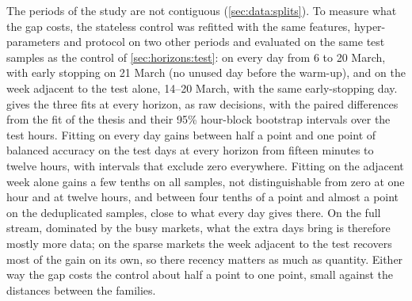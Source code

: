 The periods of the study are not contiguous (\cref{sec:data:splits}).  To measure what the
gap costs, the stateless control was refitted with the same features, hyper-parameters and
protocol on two other periods and evaluated on the same test samples as the control of
\cref{sec:horizons:test}: on every day from 6 to 20 March, with early stopping on 21 March
(no unused day before the warm-up), and on the week adjacent to the test alone, 14--20 March,
with the same early-stopping day.   gives the three fits at every horizon,
as raw decisions, with the paired differences from the fit of the thesis and their 95\%
hour-block bootstrap intervals over the test hours.  Fitting on every day gains between half
a point and one point of balanced accuracy on the test days at every horizon from fifteen
minutes to twelve hours, with intervals that exclude zero everywhere.  Fitting on the adjacent week alone gains a few tenths on all
samples, not distinguishable from zero at one hour and at twelve hours, and between four
tenths of a point and almost a point on the deduplicated samples, close to what every day gives there.
On the full stream, dominated by the busy markets, what the extra days bring is therefore
mostly more data; on the sparse markets the week adjacent to the test recovers most of the
gain on its own, so there recency matters as much as quantity.  Either way the gap costs the
control about half a point to one point, small against the distances between the families.


